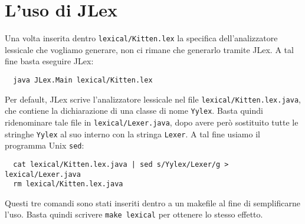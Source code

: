 \section{L'uso di JLex}\label{sec:use_jlex}
%
Una volta inserita dentro \texttt{lexical/Kitten.lex} la specifica
dell'analizzatore lessicale che vogliamo generare, non ci rimane
che generarlo tramite JLex. A tal fine basta eseguire JLex:
%
\begin{verbatim}
  java JLex.Main lexical/Kitten.lex
\end{verbatim}
%
Per default, JLex scrive l'analizzatore lessicale nel file
\texttt{lexical/Kitten.lex.java}, che contiene
la dichiarazione di una classe di nome \texttt{Yylex}.
Basta quindi rideno\-mi\-nare
tale file in \texttt{lexical/Lexer.java}, dopo avere
per\`o sostituito tutte le stringhe \texttt{Yylex} al suo interno con la
stringa \texttt{Lexer}. A tal fine usiamo il programma Unix \texttt{sed}:
%
\begin{verbatim}
  cat lexical/Kitten.lex.java | sed s/Yylex/Lexer/g > lexical/Lexer.java
  rm lexical/Kitten.lex.java
\end{verbatim}
%
Questi tre comandi sono stati inseriti dentro a un makefile al fine
di semplificarne l'uso. Basta quindi scrivere \texttt{make lexical}
per ottenere lo stesso effetto.

